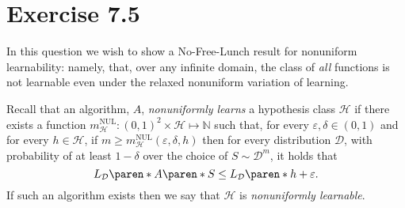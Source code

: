 \documentclass[10pt, a4paper, twoside]{amsart}
\theoremstyle{plain}
\newcommand{\N}{\ensuremath{\mathbb{N}}}
\DeclarePairedDelimiter\paren()
\newcommand{\cH}{\ensuremath{\mathcal{H}}}
\newcommand{\cD}{\ensuremath{\mathcal{D}}}
\begin{document}
\section*{Exercise 7.5}
In this question we wish to show a No-Free-Lunch result for nonuniform learnability: namely, that, over any infinite domain, the class of \textit{all} functions is not learnable even under the relaxed nonuniform variation of learning.

Recall that an algorithm, $A$, \textit{nonuniformly learns} a hypothesis class $\cH$ if there exists a function $m_{\cH}^{\text{NUL}}:(0,1)^2 \times \cH \mapsto \N$ such that, for every $\varepsilon, \delta \in (0,1)$ and for every $h \in \cH$, if $m \geq m_{\cH}^{\text{NUL}}(\varepsilon, \delta, h)$ then for every distribution $\cD$, with probability of at least $1-\delta$ over the choice of $S \sim \cD^m$, it holds that
\begin{equation*}
  L_{\cD}\paren*{A\paren*{S}} \leq L_{\cD}\paren*{h} + \varepsilon.
\end{equation*}
If such an algorithm exists then we say that $\cH$ is \textit{nonuniformly learnable}.
\end{document}
